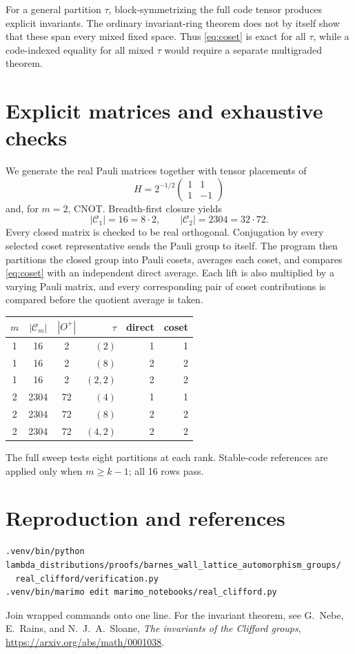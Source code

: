\documentclass[11pt]{article}
\begin{document}
For a general partition $\tau$, block-symmetrizing the full code tensor
produces explicit invariants.  The ordinary invariant-ring theorem does not
by itself show that these span every mixed fixed space.  Thus \eqref{eq:coset}
is exact for all $\tau$, while a code-indexed equality for all mixed $\tau$
would require a separate multigraded theorem.

\section{Explicit matrices and exhaustive checks}
We generate the real Pauli matrices together with tensor placements of
\[
 H=2^{-1/2}\begin{pmatrix}1&1\\1&-1\end{pmatrix}
\]
and, for $m=2$, CNOT.  Breadth-first closure yields
\[
|\mathcal C_1|=16=8\cdot2,
\qquad |\mathcal C_2|=2304=32\cdot72.
\]
Every closed matrix is checked to be real orthogonal.  Conjugation by every
selected coset representative sends the Pauli group to itself.  The program
then partitions the closed group into Pauli cosets, averages each coset, and
compares \eqref{eq:coset} with an independent direct average.  Each lift is
also multiplied by a varying Pauli matrix, and every corresponding pair of
coset contributions is compared before the quotient average is taken.

\begin{center}
\begin{tabular}{@{}cccrrr@{}}\toprule
$m$&$|\mathcal C_m|$&$|O^+|$&$\tau$&direct&coset\\\midrule
1&16&2&$(2)$&1&1\\
1&16&2&$(8)$&2&2\\
1&16&2&$(2,2)$&2&2\\
2&2304&72&$(4)$&1&1\\
2&2304&72&$(8)$&2&2\\
2&2304&72&$(4,2)$&2&2\\\bottomrule
\end{tabular}
\end{center}
The full sweep tests eight partitions at each rank.  Stable-code references
are applied only when $m\geq k-1$; all 16 rows pass.

\section{Reproduction and references}
\begin{verbatim}
.venv/bin/python lambda_distributions/proofs/barnes_wall_lattice_automorphism_groups/
  real_clifford/verification.py
.venv/bin/marimo edit marimo_notebooks/real_clifford.py
\end{verbatim}
Join wrapped commands onto one line.  For the invariant theorem, see
G.~Nebe, E.~Rains, and N.~J.~A.~Sloane,
\emph{The invariants of the Clifford groups},
\url{https://arxiv.org/abs/math/0001038}.
\end{document}
